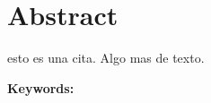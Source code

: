 \section{Abstract}
\label{section:abstract}

\lipsum[1] esto es una cita\cite{DummyArticle:2}. \newline
\lipsum[2] Algo mas de texto.

\vfill
\textbf{Keywords: } \textit{\palabrasClave}